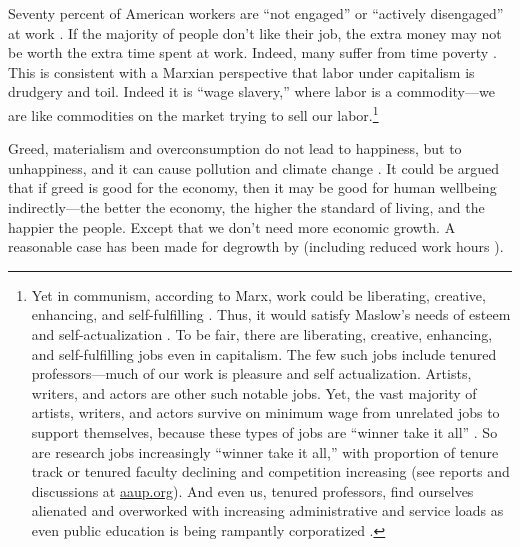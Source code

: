 \documentclass[10pt, letterpaper]{article}
\begin{document}
\begin{spacing}{1.8}
Seventy percent of American workers are ``not engaged'' or ``actively disengaged'' at work \citep[][]{harvey14}. 
If the majority of people don't like their job, the extra money may not be worth
the extra time spent at work. Indeed, many suffer from time poverty
\citep{williams16}. This is consistent with a Marxian perspective that labor
under capitalism is drudgery and toil. Indeed it is ``wage slavery,'' where
labor is a commodity---we are like commodities on the market trying to sell our labor.\footnote{Yet in communism, according to Marx, work could be
  liberating, creative, enhancing, and self-fulfilling \citep{spencer20}. Thus,
  it would satisfy Maslow's needs of esteem and self-actualization
  \citep{maslow87}. 
%
   To be fair, there are liberating, creative, enhancing, and
  self-fulfilling jobs even in capitalism. The few such jobs include tenured professors---much
of our work is pleasure and self actualization. %
Artists, writers, and actors are other such notable jobs. Yet, the vast majority of
artists, writers, and actors survive on minimum wage from unrelated jobs to support
themselves, because these types of jobs are ``winner take it all''
\citep{frank12}. So are research jobs increasingly ``winner take it all,'' with
proportion of tenure track or tenured faculty declining and competition
increasing (see reports and discussions at \url{aaup.org}).
 And even us, tenured professors, find ourselves alienated and overworked with
 increasing administrative and service loads as even public education is being rampantly corporatized \citep{mills2012corporatization,cox2013corporatization,millsNYT12fa,CatropaNYT20feb8,schmidlinNYT15oct10}.

} 

Greed, materialism and overconsumption do not lead to happiness, but to unhappiness, and it can cause pollution and climate change \citep{leonard10,pachauri14}.
 It could be argued that if greed is good for the economy, then  it may be
 good for human wellbeing indirectly---the better the economy, the higher the
 standard of living, and the happier the people. Except that we don't need more
 economic growth. A reasonable case has been made for degrowth by
 \cite{kallis12,kallis11,bergh11} (including reduced work hours \citep{fitzgerald2018working}).
 

\end{spacing}
\end{document}
